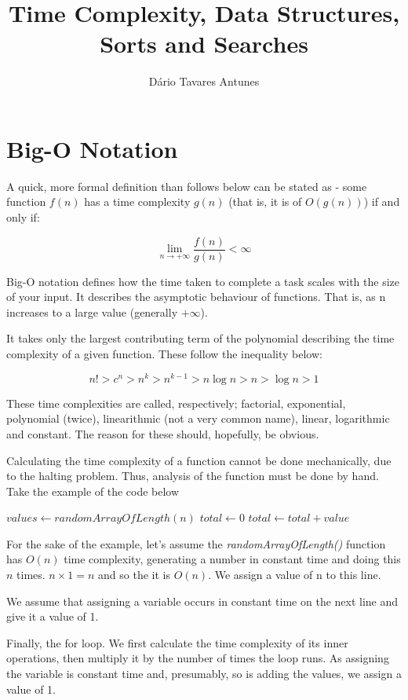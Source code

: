 \documentclass[]{article}
\title{Time Complexity, Data Structures, Sorts and Searches}
\author{D\'{a}rio Tavares Antunes}
\date{}
\newcommand{\numberLess}[1]{
\addcontentsline{toc}{section}{#1}
\section*{#1}
}
\begin{document}
	
\maketitle

\tableofcontents

\pagebreak

\numberLess{Big-O Notation}

A quick, more formal definition than follows below can be stated as - some function $f(n)$ has a time complexity $g(n)$ (that is, it is of $O(g(n))$) if and only if:

\[\lim_{n \to +\infty}\frac{f(n)}{g(n)} < \infty\]

Big-O notation defines how the time taken to complete a task scales with the size of your input. It describes the asymptotic behaviour of functions. That is, as n increases to a large value (generally $+\infty$).

It takes only the largest contributing term of the polynomial describing the time complexity of a given function. These follow the inequality below:

\[n! > c^{n} > n^{k} > n^{k-1} > n\log{n} > n > \log{n} > 1\]

These time complexities are called, respectively; factorial, exponential, polynomial (twice), linearithmic (not a very common name), linear, logarithmic and constant. The reason for these should, hopefully, be obvious.

Calculating the time complexity of a function cannot be done mechanically, due to the halting problem. Thus, analysis of the function must be done by hand. Take the example of the code below

\begin{algorithmic}[1]
	\State $values \gets randomArrayOfLength(n)$
	\State $total \gets 0$
		\State $total \gets total + value$
	\EndFor
\end{algorithmic}

For the sake of the example, let's assume the \emph{randomArrayOfLength()} function has $O(n)$ time complexity, generating a number in constant time and doing this $n$ times. $n \times 1 = n$ and so the it is $O(n)$. We assign a value of n to this line.

We assume that assigning a variable occurs in constant time on the next line and give it a value of 1.

Finally, the for loop. We first calculate the time complexity of its inner operations, then multiply it by the number of times the loop runs. As assigning the variable is constant time and, presumably, so is adding the values, we assign a value of 1.
\end{document}
